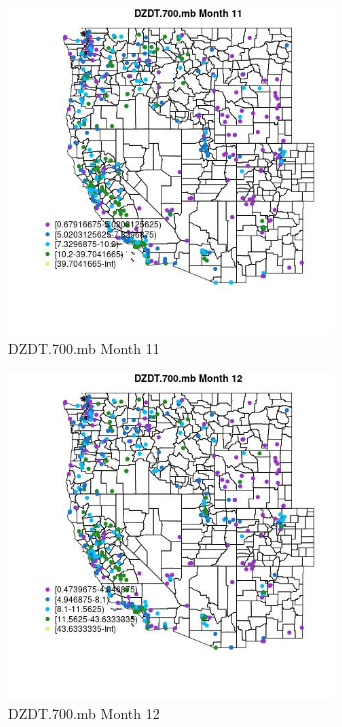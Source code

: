 \begin{figure} 
\centering  
\includegraphics[width=0.77\textwidth]{Code_Outputs/ML_input_report_ML_input_PM25_Step5_part_d_de_duplicated_aves_ML_input_MapObsMo11DZDT700mb.jpg} 
\caption{\label{fig:ML_input_report_ML_input_PM25_Step5_part_d_de_duplicated_aves_ML_inputMapObsMo11DZDT700mb}DZDT.700.mb Month 11} 
\end{figure} 
 

\begin{figure} 
\centering  
\includegraphics[width=0.77\textwidth]{Code_Outputs/ML_input_report_ML_input_PM25_Step5_part_d_de_duplicated_aves_ML_input_MapObsMo12DZDT700mb.jpg} 
\caption{\label{fig:ML_input_report_ML_input_PM25_Step5_part_d_de_duplicated_aves_ML_inputMapObsMo12DZDT700mb}DZDT.700.mb Month 12} 
\end{figure} 
 

